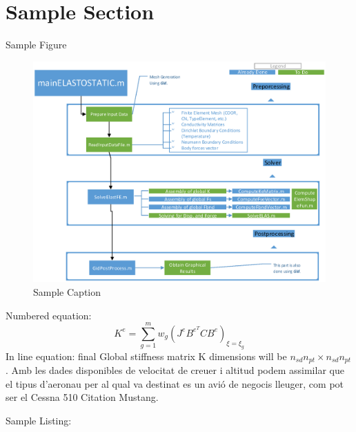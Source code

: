 \section{Sample Section}
Sample Figure
\begin{figure}[H]
	\centering
	\includegraphics[scale=0.9]{./pics/sample}
	\caption{Sample Caption}
\end{figure}
Numbered equation:
\begin{equation}
	K^e = \sum_{g=1}^{m}w_g (J^eB^{e^T}C B^e)_{\xi=\xi_g}
\end{equation}
In line equation:
final Global stiffness matrix K dimensions will be $n_{sd}n_{pt}\times n_{sd}n_{pt}$.
Amb les dades disponibles de velocitat de creuer i altitud podem assimilar que el tipus d'aeronau per al qual va destinat es un avió de negocis lleuger, com pot ser el Cessna 510 Citation Mustang. 



Sample Listing:

